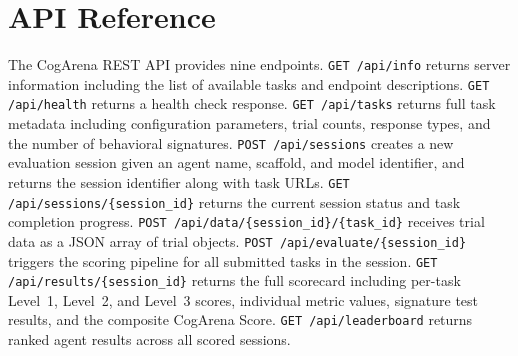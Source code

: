 \section{API Reference}
\label{app:api}

The CogArena REST API provides nine endpoints. \texttt{GET /api/info} returns server information including the list of available tasks and endpoint descriptions. \texttt{GET /api/health} returns a health check response. \texttt{GET /api/tasks} returns full task metadata including configuration parameters, trial counts, response types, and the number of behavioral signatures. \texttt{POST /api/sessions} creates a new evaluation session given an agent name, scaffold, and model identifier, and returns the session identifier along with task URLs. \texttt{GET /api/sessions/\{session\_id\}} returns the current session status and task completion progress. \texttt{POST /api/data/\{session\_id\}/\{task\_id\}} receives trial data as a JSON array of trial objects. \texttt{POST /api/evaluate/\{session\_id\}} triggers the scoring pipeline for all submitted tasks in the session. \texttt{GET /api/results/\{session\_id\}} returns the full scorecard including per-task Level~1, Level~2, and Level~3 scores, individual metric values, signature test results, and the composite CogArena Score. \texttt{GET /api/leaderboard} returns ranked agent results across all scored sessions.
